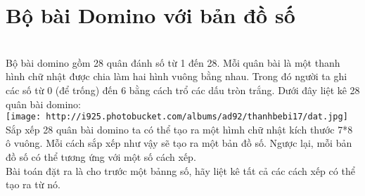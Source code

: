 \section{\textbf{    Bộ bài Domino với bản đồ số   }}


\\   Bộ bài domino gồm 28 quân đánh số từ 1 đến 28. Mỗi quân bài là một thanh hình chữ nhật được chia làm hai hình vuông bằng nhau. Trong đó người ta ghi các số từ 0 (để trống) đến 6 bằng cách trổ các dấu tròn trắng. Dưới đây liệt kê 28 quân bài domino:   
\\
\texttt{[image: http://i925.photobucket.com/albums/ad92/thanhbebi17/dat.jpg]}
\\   Sắp xếp 28 quân bài domino ta có thể tạo ra một hìmh chữ nhật kích thước 7*8 ô vuông. Mỗi cách sắp xếp như vậy sẽ tạo ra một bản đồ số. Ngược lại, mỗi bản đồ số có thể tương ứng với một số cách xếp.   
\\   Bài toán đặt ra là cho trước một bảnng số, hãy liệt kê tất cả các cách xếp có thể tạo ra từ nó.  

\